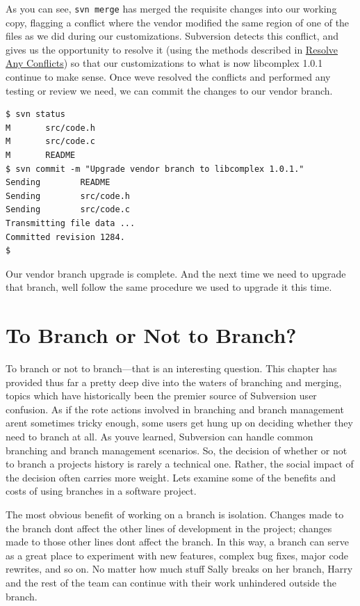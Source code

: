 As you can see, \texttt{svn\ merge} has merged the requisite changes
into our working copy, flagging a conflict where the vendor modified the
same region of one of the files as we did during our customizations.
Subversion detects this conflict, and gives us the opportunity to
resolve it (using the methods described in
\hyperref[svn.tour.cycle.resolve]{Resolve Any Conflicts}) so that our
customizations to what is now libcomplex 1.0.1 continue to make sense.
Once we\textquotesingle ve resolved the conflicts and performed any
testing or review we need, we can commit the changes to our vendor
branch.

\begin{verbatim}
$ svn status
M       src/code.h
M       src/code.c
M       README
$ svn commit -m "Upgrade vendor branch to libcomplex 1.0.1."
Sending        README
Sending        src/code.h
Sending        src/code.c
Transmitting file data ...
Committed revision 1284.
$
\end{verbatim}

Our vendor branch upgrade is complete. And the next time we need to
upgrade that branch, we\textquotesingle ll follow the same procedure we
used to upgrade it this time.

\section{To Branch or Not to Branch?}\label{svn.branchmerge.when}

To branch or not to branch---that is an interesting question. This
chapter has provided thus far a pretty deep dive into the waters of
branching and merging, topics which have historically been the premier
source of Subversion user confusion. As if the rote actions involved in
branching and branch management aren\textquotesingle t sometimes tricky
enough, some users get hung up on deciding whether they need to branch
at all. As you\textquotesingle ve learned, Subversion can handle common
branching and branch management scenarios. So, the decision of whether
or not to branch a project\textquotesingle s history is rarely a
technical one. Rather, the social impact of the decision often carries
more weight. Let\textquotesingle s examine some of the benefits and
costs of using branches in a software project.

The most obvious benefit of working on a branch is isolation. Changes
made to the branch don\textquotesingle t affect the other lines of
development in the project; changes made to those other lines
don\textquotesingle t affect the branch. In this way, a branch can serve
as a great place to experiment with new features, complex bug fixes,
major code rewrites, and so on. No matter how much stuff Sally breaks on
her branch, Harry and the rest of the team can continue with their work
unhindered outside the branch.

